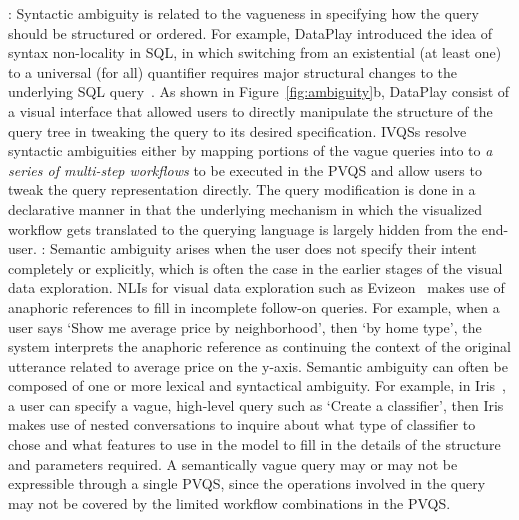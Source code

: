 : Syntactic ambiguity is related to the vagueness in specifying how the query should be structured or ordered. For example, DataPlay introduced the idea of syntax non-locality in SQL, in which switching from an existential (at least one) to a universal (for all) quantifier requires major structural changes to the underlying SQL query~\cite{Abouzied2012}. As shown in Figure~\ref{fig:ambiguity}b, DataPlay consist of a visual interface that allowed users to directly manipulate the structure of the query tree in tweaking the query to its desired specification. IVQSs resolve syntactic ambiguities either by mapping portions of the vague queries into to \textit{a series of multi-step workflows} to be executed in the PVQS and allow users to tweak the query representation directly. The query modification is done in a declarative manner in that the underlying mechanism in which the visualized workflow gets translated to the querying language is largely hidden from the end-user. 
: Semantic ambiguity arises when the user does not specify their intent completely or explicitly, which is often the case in the earlier stages of the visual data exploration. NLIs for visual data exploration such as Evizeon~\cite{Hoque2017} makes use of anaphoric references to fill in incomplete follow-on queries. For example, when a user says `Show me average price by neighborhood', then `by home type', the system interprets the anaphoric reference as continuing the context of the original utterance related to average price on the y-axis. Semantic ambiguity can often be composed of one or more lexical and syntactical ambiguity. For example, in Iris~\cite{Fast2018}, a user can specify a vague, high-level query such as `Create a classifier', then Iris makes use of nested conversations to inquire about what type of classifier to chose and what features to use in the model to fill in the details of the structure and parameters required. A semantically vague query may or may not be expressible through a single PVQS, since the operations involved in the query may not be covered by the limited workflow combinations in the PVQS. 


